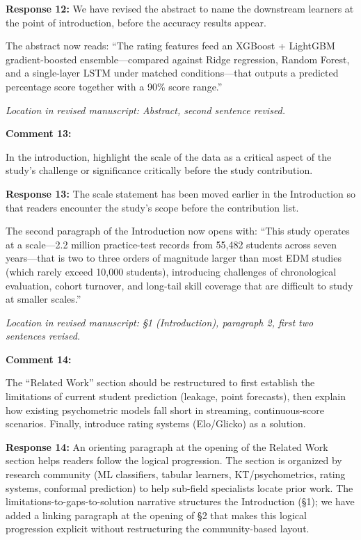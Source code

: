 \documentclass[11pt]{article}
\newcommand{\rev}[1]{{\color{ccolor}#1}}
\begin{document}
\textbf{Response 12:}
We have revised the abstract to name the downstream learners at the point of introduction,
before the accuracy results appear.

\rev{The abstract now reads: ``The rating features feed an XGBoost + LightGBM
gradient-boosted ensemble---compared against Ridge regression, Random Forest, and a
single-layer LSTM under matched conditions---that outputs a predicted percentage score
together with a 90\% score range.''}

\textit{Location in revised manuscript: Abstract, second sentence revised.}

\bigskip

\textbf{Comment 13:}
\begin{rquote}
In the introduction, highlight the scale of the data as a critical aspect of the
study's challenge or significance critically before the study contribution.
\end{rquote}

\textbf{Response 13:}
The scale statement has been moved earlier in the Introduction so that readers
encounter the study's scope before the contribution list.

\rev{The second paragraph of the Introduction now opens with: ``This study operates at
a scale---2.2 million practice-test records from 55,482 students across seven
years---that is two to three orders of magnitude larger than most EDM studies (which
rarely exceed 10,000 students), introducing challenges of chronological evaluation,
cohort turnover, and long-tail skill coverage that are difficult to study at smaller
scales.''}

\textit{Location in revised manuscript: \S1 (Introduction), paragraph 2, first two
sentences revised.}

\bigskip

\textbf{Comment 14:}
\begin{rquote}
The ``Related Work'' section should be restructured to first establish the limitations
of current student prediction (leakage, point forecasts), then explain how existing
psychometric models fall short in streaming, continuous-score scenarios. Finally,
introduce rating systems (Elo/Glicko) as a solution.
\end{rquote}

\textbf{Response 14:}
An orienting paragraph at the opening of the Related Work section helps readers follow
the logical progression. The section is organized by research community (ML classifiers,
tabular learners, KT/psychometrics, rating systems, conformal prediction) to help
sub-field specialists locate prior work. The limitations-to-gaps-to-solution narrative
structures the Introduction (\S1); we have added a linking paragraph at the opening
of \S2 that makes this logical progression explicit without restructuring the community-based
layout.
\end{document}
